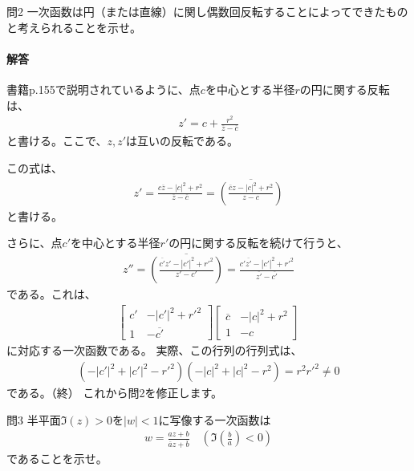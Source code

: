 \newpage
\begin{mysimplebox}{問2}
    一次函数は円（または直線）に関し偶数回反転することによってできたものと考えられることを示せ。
\end{mysimplebox}
\paragraph{解答}
書籍p.155で説明されているように、点$c$を中心とする半径$r$の円に関する反転は、
\begin{align*}
    z'=c+\frac{r^2}{\overline{z}-\overline{c}}
\end{align*}
と書ける。ここで、$z,z'$は互いの反転である。

この式は、
\begin{align*}
    z'=\frac{c\overline{z}-|c|^2+r^2}{\overline{z}-\overline{c}}
    =\overline{\left(\frac{\overline{c}z-|c|^2+r^2}{z-c}\right)}
\end{align*}
と書ける。

さらに、点$c'$を中心とする半径$r'$の円に関する反転を続けて行うと、
\begin{align*}
    z''=\overline{\left(\frac{\overline{c'}z'-|c'|^2+r'^2}{z'-c'}\right)}
    =\frac{c'\overline{z'}-|c'|^2+r'^2}{\overline{z'}-\overline{c'}}
\end{align*}
である。これは、
\begin{align*}
    \begin{bmatrix}
        c'&-|c'|^2+r'^2\\
        1&-\overline{c'}
    \end{bmatrix}
    \begin{bmatrix}
        \overline{c}&-|c|^2+r^2\\
        1&-c
    \end{bmatrix}
\end{align*}
に対応する一次函数である。
実際、この行列の行列式は、
\begin{align*}
    (-|c'|^2+|c'|^2-r'^2)(-|c|^2+|c|^2-r^2)=r^2r'^2\neq0
\end{align*}
である。（終）
これから問2を修正します。

\newpage
\begin{mysimplebox}{問3}
    半平面$\Im(z)>0$を$|w|<1$に写像する一次函数は
    \begin{align*}
        w=\frac{az+b}{\overline{a}z+\overline{b}}
        \quad\left(\Im\left(\frac{b}{a}\right)<0\right)
    \end{align*}
    であることを示せ。
\end{mysimplebox}
